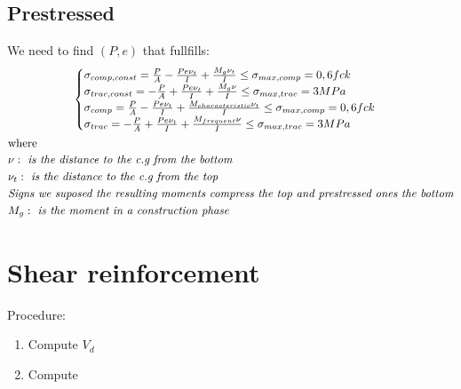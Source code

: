 \documentclass[landscape]{article}
\begin{document}
\begin{multicols*}{2}
\subsection{Prestressed} %
\label{sub:prestressed}
We need to find $(P,e)$ that fullfills:
    \begin{gather}\label{eq:2.1}
      \begin{cases}
        \sigma_{comp,const} = \frac{P}{A} - \frac{P e \nu_t}{I} + \frac{M_g \nu_t}{I} \leq \sigma_{max,comp}=0,6fck\\
        \sigma_{trac,const} = -\frac{P}{A} + \frac{P e \nu_t}{I} + \frac{M_g \nu}{I} \leq \sigma_{max,trac}=3MPa\\
        \sigma_{comp} = \frac{P}{A} - \frac{P e \nu_t}{I} + \frac{M_{characteristic} \nu_t}{I} \leq \sigma_{max,comp}=0,6fck\\
        \sigma_{trac} = -\frac{P}{A} + \frac{P e \nu_t}{I} + \frac{M_{frequent} \nu}{I} \leq \sigma_{max,trac}=3MPa
      \end{cases}\\
      \shortintertext{where}
      \begin{aligned}
        &\nu: \emph{ is the distance to the c.g from the bottom} \\
        &\nu_t: \emph{ is the distance to the c.g from the top} \\
        &\emph{Signs }\emph{we suposed the resulting moments compress the top and prestressed ones the bottom} \\
        & M_g: \emph{ is the moment in a construction phase}
      \end{aligned}\notag
    \end{gather}


\section{Shear reinforcement} %
\label{sec:shear_reinforcement}
Procedure:
\begin{enumerate}
  \item Compute $V_d$

  \item Compute


\end{enumerate}
\end{multicols*}
\end{document}
